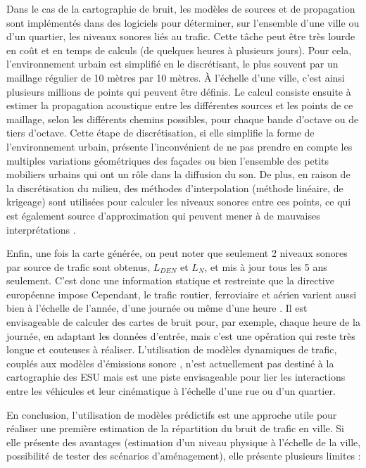 Dans le cas de la cartographie de bruit, les modèles de sources et de propagation sont implémentés dans des logiciels pour déterminer, sur l'ensemble d'une ville ou d'un quartier, les niveaux sonores liés au trafic. Cette tâche peut être très lourde en coût et en temps de calculs (de quelques heures à plusieurs jours). Pour cela, l'environnement urbain est simplifié en le discrétisant, le plus souvent par un maillage régulier de 10 mètres par 10 mètres. À l'échelle d'une ville, c'est ainsi plusieurs millions de points qui peuvent être définis. Le calcul consiste ensuite à estimer la propagation acoustique entre les différentes sources et les points de ce maillage, selon les différents chemins possibles, pour chaque bande d'octave ou de tiers d'octave.
Cette étape de discrétisation, si elle simplifie la forme de l'environnement urbain, présente l'inconvénient de ne pas prendre en compte les multiples variations géométriques des façades ou bien l'ensemble des petits mobiliers urbains qui ont un rôle dans la diffusion du son. 
De plus, en raison de la discrétisation du milieu, des méthodes d'interpolation (méthode linéaire, de krigeage) sont utilisées pour calculer les niveaux sonores entre ces points, ce qui est également source d'approximation qui peuvent mener à de mauvaises interprétations \cite{van_leeuwen_noise_2015}.

Enfin, une fois la carte générée, on peut noter que seulement 2 niveaux sonores par source de trafic sont obtenus, $L_{DEN}$ et $L_N$, et mis à jour tous les 5 ans seulement. C'est donc une information statique et restreinte que la directive européenne impose Cependant, le trafic routier, ferroviaire et aérien varient aussi bien à l'échelle de l'année, d'une journée ou même d'une heure \cite{lv2015traffic}. Il est envisageable de calculer des cartes de bruit pour, par exemple, chaque heure de la journée, en adaptant les données d'entrée, mais c'est une opération qui reste très longue et couteuses à réaliser.
L'utilisation de modèles dynamiques de trafic, couplés aux modèles d'émissions sonore  \cite{can2010traffic}, n'est actuellement pas destiné à la cartographie des ESU mais est une piste envisageable pour lier les interactions entre les véhicules et leur cinématique à l'échelle d'une rue ou d'un quartier.

En conclusion, l'utilisation de modèles prédictifs est une approche utile pour réaliser une première estimation de la répartition du bruit de trafic en ville. Si elle présente des avantages (estimation d'un niveau physique à l'échelle de la ville, possibilité de tester des scénarios d'aménagement), elle présente plusieurs limites : 

